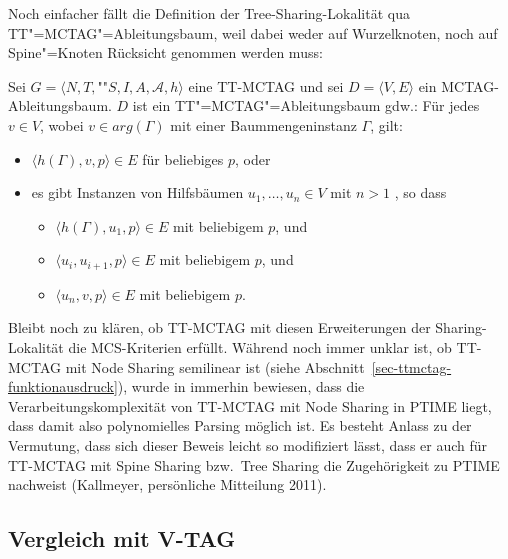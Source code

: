 Noch einfacher fällt die Definition der Tree-Sharing-Lokalität qua TT"=MCTAG"=Ableitungsbaum, weil dabei weder auf Wurzelknoten, noch auf Spine"=Knoten Rücksicht genommen werden muss:
\begin{definition}
Sei $G = \langle N,T,$""$S,I,A,\mathcal{A},h \rangle$ eine TT-MCTAG und sei $D = \langle V,E \rangle$ ein MCTAG-Ableitungsbaum. $D$ ist ein TT"=MCTAG"=Ableitungsbaum gdw.:
Für jedes $v \in V$, wobei $v \in arg(\Gamma)$ mit einer Baummengeninstanz $\Gamma$, gilt:
\begin{itemize} 
  \item $\langle h(\Gamma),v,p \rangle \in E$ für beliebiges $p$, oder
  \item es gibt Instanzen von Hilfsbäumen $u_1, \ldots, u_n \in V$ mit $n>1$ , so dass
  \begin{itemize}
    \item $\langle h(\Gamma),u_1,p \rangle \in E$ mit beliebigem $p$, und
    \item $\langle u_i,u_{i+1},p \rangle \in E$ mit beliebigem $p$, und
    \item $\langle u_n,v,p \rangle \in E$ mit beliebigem $p$.
  \end{itemize}
\end{itemize}  
\end{definition}

Bleibt noch zu klären, ob TT-MCTAG mit diesen Erweiterungen der Sharing-Lokalität die MCS-Kriterien erfüllt. Während noch immer unklar ist, ob TT-MCTAG mit Node Sharing semilinear ist (siehe Abschnitt~\ref{sec-ttmctag-funktionausdruck}), wurde in \cite{Kallmeyer:Satta:09} immerhin bewiesen, dass die Verarbeitungskomplexität von TT-MCTAG mit Node Sharing in PTIME liegt, dass damit also polynomielles Parsing möglich ist. Es besteht Anlass zu der Vermutung, dass sich dieser Beweis leicht so modifiziert lässt, dass er auch für TT-MCTAG mit Spine Sharing bzw.\ Tree Sharing die Zugehörigkeit zu PTIME nachweist (Kallmeyer, persönliche Mitteilung 2011).%





\subsection{Vergleich mit V-TAG}

